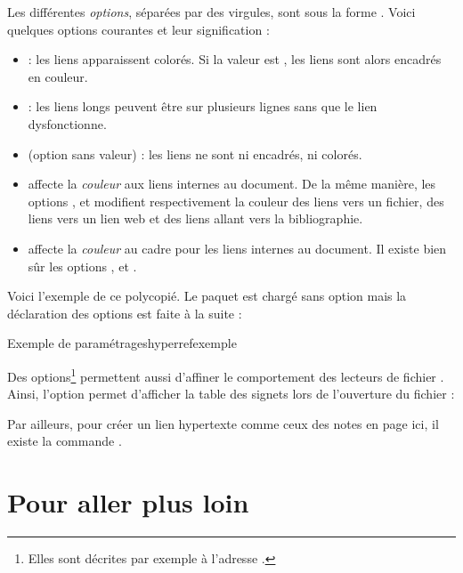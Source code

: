Les différentes \emph{options}, séparées par des virgules, sont sous la forme . Voici quel\-ques options courantes et leur signification :
\begin{itemize} \label{hyperrefcouleur} 
\item {} : les liens apparaissent colorés. Si la valeur est , les liens sont alors encadrés en couleur.
\item {} : les liens longs peuvent être sur plusieurs lignes sans que le lien dysfonctionne.
\item {} (option sans valeur) : les liens ne sont ni encadrés, ni colorés.
\item {} affecte la {\it couleur} aux liens internes au document. De la même manière, les options ,  et  modifient respectivement la couleur des liens vers un fichier, des liens vers un lien web et des liens allant vers la bibliographie.
\item {} affecte la {\it couleur} au cadre pour les liens internes au document. Il existe bien sûr les options ,  et . \\
\end{itemize}

Voici l'exemple de ce polycopié. Le paquet  est chargé sans option mais la déclaration des options est faite à la suite :
\begin{codesimple}{Exemple de paramétrages}{hyperrefexemple}
\hypersetup{urlcolor=orange3,linkcolor=orange3,citecolor=orange3,breaklinks}
\end{codesimple}

Des options\footnote{Elles sont décrites par exemple à l'adresse  .} permettent aussi d'affiner le comportement des lecteurs de fichier . Ainsi, l'option  permet d'afficher la table des signets lors de l'ouverture du fichier  :

Par ailleurs, pour créer un lien hypertexte comme ceux des notes en page ici, il existe la commande .



\section{Pour aller plus loin}

